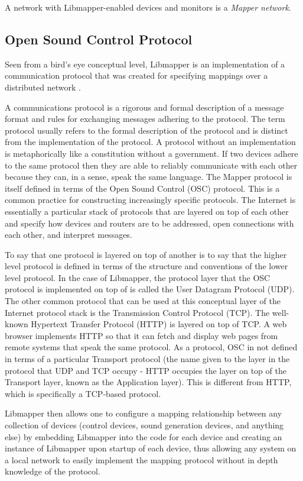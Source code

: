 A network with Libmapper-enabled devices and monitors is a \emph{Mapper network}.

\subsection{Open Sound Control Protocol}

Seen from a bird's eye conceptual level, Libmapper is an implementation of a communication protocol that was created for specifying mappings over a distributed network \cite{Malloch2009}. 

A communications protocol is a rigorous and formal description of a message format and rules for exchanging messages adhering to the protocol. The term protocol usually refers to the formal description of the protocol and is distinct from the implementation of the protocol. A protocol without an implementation is metaphorically like a constitution without a government. If two devices adhere to the same protocol then they are able to reliably communicate with each other because they can, in a sense, speak the same language. The Mapper protocol is itself defined in terms of the Open Sound Control (OSC) protocol. This is a common practice for constructing increasingly specific protocols. The Internet is essentially a particular stack of protocols that are layered on top of each other and specify how devices and routers are to be addressed, open connections with each other, and interpret messages.

To say that one protocol is layered on top of another is to say that the higher level protocol is defined in terms of the structure and conventions of the lower level protocol. In the case of Libmapper, the protocol layer that the OSC protocol is implemented on top of is called the User Datagram Protocol (UDP). The other common protocol that can be used at this conceptual layer of the Internet protocol stack is the Transmission Control Protocol (TCP). The well-known Hypertext Transfer Protocol (HTTP) is layered on top of TCP. A web browser implements HTTP so that it can fetch and display web pages from remote systems that speak the same protocol. As a protocol, OSC in not defined in terms of a particular Transport protocol (the name given to the layer in the protocol that UDP and TCP occupy - HTTP occupies the layer on top of the Transport layer, known as the Application layer). This is different from HTTP, which is specifically a TCP-based protocol.

Libmapper then allows one to configure a mapping relationship between any collection of devices (control devices, sound generation devices, and anything else) by embedding Libmapper into the code for each device and creating an instance of Libmapper upon startup of each device, thus allowing any system on a local network to easily implement the mapping protocol without in depth knowledge of the protocol.

